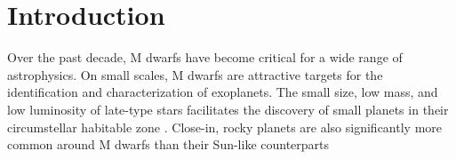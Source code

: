 \documentclass[twocolumn]{aastex62}
\begin{document}



\section{Introduction}\label{sec:intro}
Over the past decade, M dwarfs have become critical for a wide range of astrophysics. On small scales, M dwarfs are attractive targets for the identification and characterization of exoplanets. The small size, low mass, and low luminosity of late-type stars facilitates the discovery of small planets \citep[e.g.][]{Muirhead2012,Martinez:2017aa,Mann:2018} in their circumstellar habitable zone \citep[e.g.,][]{Tarter2007,Shields:2016aa,Dittmann2017b}. Close-in, rocky planets are also significantly more common around M dwarfs than their Sun-like counterparts \citep{Dressing2013,2013PNAS..11019273P,Mulders2015,Gaidos2016b}
\end{document}

